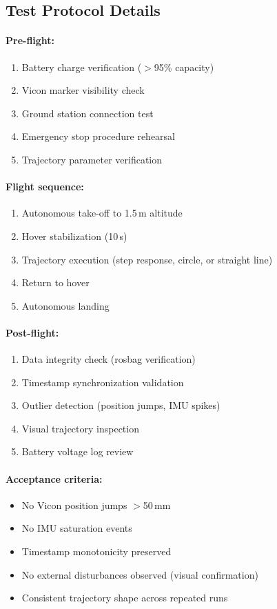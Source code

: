 \subsection{Test Protocol Details}

\paragraph{Pre-flight:}
\begin{enumerate}
\item Battery charge verification ($>$95\% capacity)
\item Vicon marker visibility check
\item Ground station connection test
\item Emergency stop procedure rehearsal
\item Trajectory parameter verification
\end{enumerate}

\paragraph{Flight sequence:}
\begin{enumerate}
\item Autonomous take-off to 1.5\,m altitude
\item Hover stabilization (10\,s)
\item Trajectory execution (step response, circle, or straight line)
\item Return to hover
\item Autonomous landing
\end{enumerate}

\paragraph{Post-flight:}
\begin{enumerate}
\item Data integrity check (rosbag verification)
\item Timestamp synchronization validation
\item Outlier detection (position jumps, IMU spikes)
\item Visual trajectory inspection
\item Battery voltage log review
\end{enumerate}

\paragraph{Acceptance criteria:}
\begin{itemize}
\item No Vicon position jumps $>$50\,mm
\item No IMU saturation events
\item Timestamp monotonicity preserved
\item No external disturbances observed (visual confirmation)
\item Consistent trajectory shape across repeated runs
\end{itemize}

